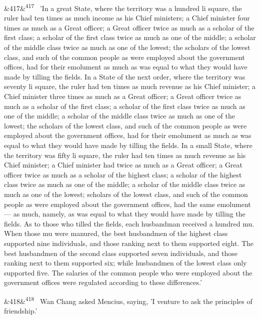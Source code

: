 \documentclass[12pt]{article}
\newcommand{\para}[1][]{\par\noindent\ifx&#1&\else\textsuperscript{\footnotesize #1}~\fi}
\begin{document}
\para[417] 'In a great State, where the territory was a hundred li square, the ruler had ten times as much income as his Chief ministers; a Chief minister four times as much as a Great officer; a Great officer twice as much as a scholar of the first class; a scholar of the first class twice as much as one of the middle; a scholar of the middle class twice as much as one of the lowest; the scholars of the lowest class, and such of the common people as were employed about the government offices, had for their emolument as much as was equal to what they would have made by tilling the fields. In a State of the next order, where the territory was seventy li square, the ruler had ten times as much revenue as his Chief minister; a Chief minister three times as much as a Great officer; a Great officer twice as much as a scholar of the first class; a scholar of the first class twice as much as one of the middle; a scholar of the middle class twice as much as one of the lowest; the scholars of the lowest class, and such of the common people as were employed about the government offices, had for their emolument as much as was equal to what they would have made by tilling the fields. In a small State, where the territory was fifty li square, the ruler had ten times as much revenue as his Chief minister; a Chief minister had twice as much as a Great officer; a Great officer twice as much as a scholar of the highest class; a scholar of the highest class twice as much as one of the middle; a scholar of the middle class twice as much as one of the lowest; scholars of the lowest class, and such of the common people as were employed about the government offices, had the same emolument --- as much, namely, as was equal to what they would have made by tilling the fields. As to those who tilled the fields, each husbandman received a hundred mu. When those mu were manured, the best husbandmen of the highest class supported nine individuals, and those ranking next to them supported eight. The best husbandmen of the second class supported seven individuals, and those ranking next to them supported six; while husbandmen of the lowest class only supported five. The salaries of the common people who were employed about the government offices were regulated according to these differences.'

\para[418] Wan Chang asked Mencius, saying, 'I venture to ask the principles of friendship.'
\end{document}
